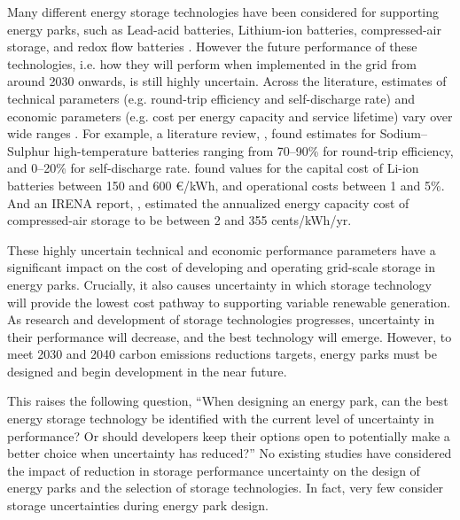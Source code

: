 Many different energy storage technologies have been considered for supporting energy parks, such as Lead-acid batteries, Lithium-ion batteries, compressed-air storage, and redox flow batteries \citep{irena2017ElectricityStorageRenewables}.
However the future performance of these technologies, i.e. how they will perform when implemented in the grid from around 2030 onwards, is still highly uncertain. Across the literature, estimates of technical parameters (e.g. round-trip efficiency and self-discharge rate) and economic parameters (e.g. cost per energy capacity and service lifetime) vary over wide ranges \citep{irena2017ElectricityStorageRenewables,kebede2022ComprehensiveReviewStationary,kittner2020ChapterGridscaleEnergy,neso2022PotentialElectricityStorage,petkov2020PowertohydrogenSeasonalEnergy}.
For example, a literature review, \citep{kebede2022ComprehensiveReviewStationary}, found estimates for Sodium--Sulphur high-temperature batteries ranging from 70--90\% for round-trip efficiency, and 0--20\% for self-discharge rate. \citep{petkov2020PowertohydrogenSeasonalEnergy} found values for the capital cost of Li-ion batteries between 150 and 600 \euro/kWh, and operational costs between 1 and 5\%. And an IRENA report, \citep{irena2017ElectricityStorageRenewables}, estimated the annualized energy capacity cost of compressed-air storage to be between 2 and 355 cents/kWh/yr.

These highly uncertain technical and economic performance parameters have a significant impact on the cost of developing and operating grid-scale storage in energy parks. Crucially, it also causes uncertainty in which storage technology will provide the lowest cost pathway to supporting variable renewable generation. As research and development of storage technologies progresses, uncertainty in their performance will decrease, and the best technology will emerge. However, to meet 2030 and 2040 carbon emissions reductions targets, energy parks must be designed and begin development in the near future.

This raises the following question, ``When designing an energy park, can the best energy storage technology be identified with the current level of uncertainty in performance? Or should developers keep their options open to potentially make a better choice when uncertainty has reduced?''
No existing studies have considered the impact of reduction in storage performance uncertainty on the design of energy parks and the selection of storage technologies. In fact, very few consider storage uncertainties during energy park design.


